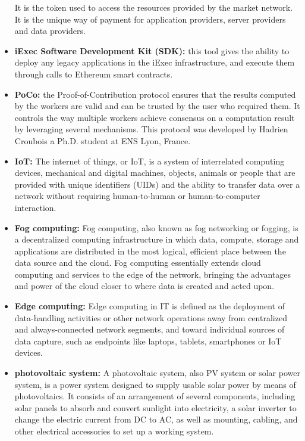 \begin{itemize}
        It is the token used to access the resources provided by the market network.
        It is the unique way of payment for application providers, server providers and data providers.

        \item \textbf{iExec Software Development Kit\cite{iexec-sdk} (SDK):}
        this tool gives the ability to deploy any legacy applications in the iExec infrastructure, and execute
        them through calls to Ethereum smart contracts.

        \item \textbf{PoCo:} the Proof-of-Contribution protocol\cite{POCO} ensures that the results computed by the
        workers are valid and can be trusted by the user who required them. It controls the way multiple
        workers achieve consensus on a computation result by leveraging several mechanisms\cite{poco-definition}.
        This protocol was developed by Hadrien Croubois\cite{hadrien-croubois} a Ph.D. student at ENS Lyon, France.

        \item \textbf{IoT:} The internet of things, or IoT, is a system of interrelated computing devices,
        mechanical and digital machines, objects, animals or people that are provided with unique identifiers
        (UIDs) and the ability to transfer data over a network without requiring human-to-human or
        human-to-computer interaction\cite{IoT}.

        \item \textbf{Fog computing:} Fog computing, also known as fog networking or fogging, is a decentralized
        computing infrastructure in which data, compute, storage and applications are distributed in the most
        logical, efficient place between the data source and the cloud. Fog computing essentially extends cloud
        computing and services to the edge of the network, bringing the advantages and power of the cloud closer
        to where data is created and acted upon\cite{fog-computing}.

        \item \textbf{Edge computing:} Edge computing in IT is defined as the deployment of data-handling
        activities or other network operations away from centralized and always-connected network segments, and
        toward individual sources of data capture, such as endpoints like laptops, tablets, smartphones or IoT
        devices\cite{edge-computing}.

        \item \textbf{photovoltaic system:} A photovoltaic system, also PV system or solar power system, is a
        power system designed to supply usable solar power by means of photovoltaics. It consists of an
        arrangement of several components, including solar panels to absorb and convert sunlight into
        electricity, a solar inverter to change the electric current from DC to AC, as well as mounting,
        cabling, and other electrical accessories to set up a working system.


\end{itemize}
